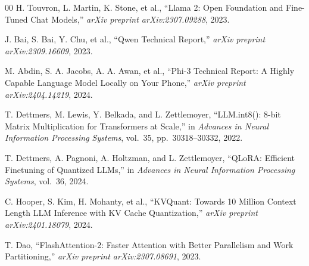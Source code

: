 \documentclass[conference]{IEEEtran}
\begin{document}
\begin{thebibliography}{00}
 H. Touvron, L. Martin, K. Stone, et al., ``Llama 2: Open Foundation and Fine-Tuned Chat Models,'' \textit{arXiv preprint arXiv:2307.09288}, 2023.

 J. Bai, S. Bai, Y. Chu, et al., ``Qwen Technical Report,'' \textit{arXiv preprint arXiv:2309.16609}, 2023.

 M. Abdin, S. A. Jacobs, A. A. Awan, et al., ``Phi-3 Technical Report: A Highly Capable Language Model Locally on Your Phone,'' \textit{arXiv preprint arXiv:2404.14219}, 2024.

 T. Dettmers, M. Lewis, Y. Belkada, and L. Zettlemoyer, ``LLM.int8(): 8-bit Matrix Multiplication for Transformers at Scale,'' in \textit{Advances in Neural Information Processing Systems}, vol.~35, pp.~30318--30332, 2022.

 T. Dettmers, A. Pagnoni, A. Holtzman, and L. Zettlemoyer, ``QLoRA: Efficient Finetuning of Quantized LLMs,'' in \textit{Advances in Neural Information Processing Systems}, vol.~36, 2024.

 C. Hooper, S. Kim, H. Mohanty, et al., ``KVQuant: Towards 10 Million Context Length LLM Inference with KV Cache Quantization,'' \textit{arXiv preprint arXiv:2401.18079}, 2024.

 T. Dao, ``FlashAttention-2: Faster Attention with Better Parallelism and Work Partitioning,'' \textit{arXiv preprint arXiv:2307.08691}, 2023.

\end{thebibliography}
\end{document}

